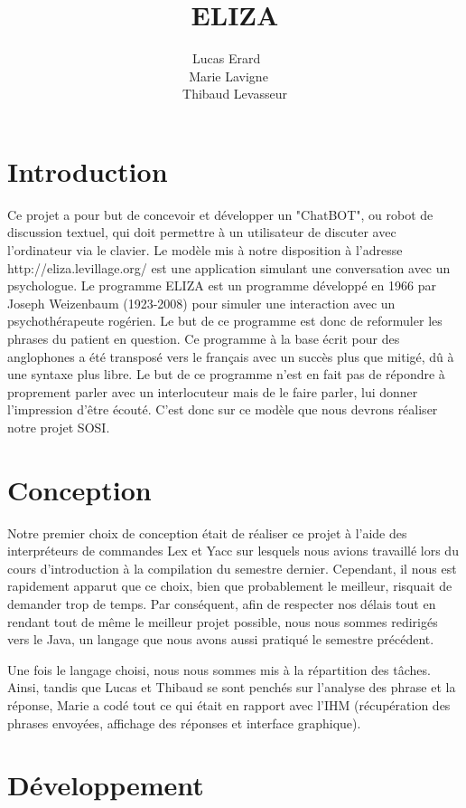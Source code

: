 \documentclass[a4paper,12pt]{article}
\title{ELIZA}
\author{Lucas Erard ~~\\ Marie Lavigne~~\\ Thibaud Levasseur}
\begin{document}
\maketitle
\newpage
\tableofcontents
\newpage
\section{Introduction}
Ce projet a pour but de concevoir et développer un "ChatBOT", ou robot de discussion textuel, qui doit permettre à un utilisateur de discuter avec l'ordinateur via le clavier. Le modèle mis à notre disposition à l'adresse http://eliza.levillage.org/ est une application simulant une conversation avec un psychologue.
Le programme ELIZA est un programme développé en 1966 par Joseph Weizenbaum (1923-2008) pour simuler une interaction avec un psychothérapeute rogérien. Le but de ce programme est donc de reformuler les phrases du patient en question.
Ce programme à la base écrit pour des anglophones a été transposé vers le français avec un succès  plus que mitigé, dû à une syntaxe plus libre.
Le but de ce programme n'est en fait pas de répondre à proprement parler avec un interlocuteur mais de le faire parler, lui donner l'impression d'être écouté.
C'est donc sur ce modèle que nous devrons réaliser notre projet SOSI.
\section{Conception}
Notre premier choix de conception était de réaliser ce projet à l'aide des interpréteurs de commandes Lex et Yacc sur lesquels nous avions travaillé lors du cours d'introduction à la compilation du semestre dernier. Cependant, il nous est rapidement apparut que ce choix, bien que probablement le meilleur, risquait de demander trop de temps. Par conséquent, afin de respecter nos délais tout en rendant tout de même le meilleur projet possible, nous nous sommes redirigés vers le Java, un langage que nous avons aussi pratiqué le semestre précédent. 

Une fois le langage choisi, nous nous sommes mis à la répartition des tâches. Ainsi, tandis que Lucas et Thibaud se sont penchés sur l'analyse des phrase et la réponse, Marie a codé tout ce qui était en rapport avec l'IHM (récupération des phrases envoyées, affichage des réponses et interface graphique). 
\section{Développement}
\end{document}
